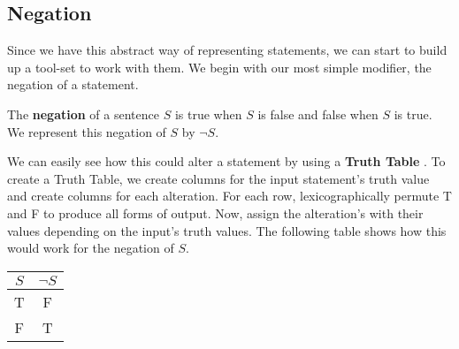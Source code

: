 \subsection{Negation}

Since we have this abstract way of representing statements, we can start to build up a tool-set to work with them.
We begin with our most simple modifier, the negation of a statement.

\begin{defn}
  \label{defn:negation}
  The \textbf{negation} of a sentence $S$ is true when $S$ is false and false when $S$ is true.
  We represent this negation of $S$ by $\neg S$.
\end{defn}


We can easily see how this could alter a statement by using a \textbf{Truth Table} .
To create a Truth Table, we create columns for the input statement's truth value and create columns for each alteration.
For each row, lexicographically permute T and F to produce all forms of output.
Now, assign the alteration's with their values depending on the input's truth values.
The following table shows how this would work for the negation of $S$.

\begin{minipage}{\linewidth}
  \centering
  \begin{tabular}{c|c}
    $S$ & $\neg S$ \\
    \hline
    T & F \\
    F & T \\
  \end{tabular}
   \label{tab:negation} 
\end{minipage}


